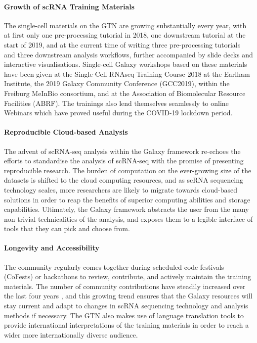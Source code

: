 \documentclass[a4paper,num-refs]{oup-contemporary}
\begin{document}
\paragraph{Growth of scRNA Training Materials}
The single-cell materials on the GTN are growing substantially every year, with at first only one pre-processing tutorial in 2018, one downstream tutorial at the start of 2019, and at the current time of writing three pre-processing tutorials and three downstream analysis workflows, further accompanied by slide decks and interactive visualisations. Single-cell Galaxy workshops based on these materials have been given at the Single-Cell RNAseq Training Course 2018 at the Earlham Institute, the 2019 Galaxy Community Conference (GCC2019), within the Freiburg MeInBio consortium, and at the Association of Biomolecular Resource Facilities (ABRF). The trainings also lend themselves seamlessly to online Webinars which have proved useful during the COVID-19 lockdown period.

\paragraph{Reproducible Cloud-based Analysis}
The advent of scRNA-seq analysis within the Galaxy framework re-echoes the efforts to standardise the analysis of scRNA-seq with the promise of presenting reproducible research. The burden of computation on the ever-growing size of the datasets is shifted to the cloud computing resources, and as scRNA sequencing technology scales, more researchers are likely to migrate towards cloud-based solutions in order to reap the benefits of superior computing abilities and storage capabilities. Ultimately, the Galaxy framework abstracts the user from the many non-trivial technicalities of the analysis, and exposes them to a legible interface of tools that they can pick and choose from.

\paragraph{Longevity and Accessibility}
The community regularly comes together during scheduled code festivals (CoFests) or hackathons to review, contribute, and actively maintain the training materials. The number of community contributions have steadily increased over the last four years \citep{afgan2018galaxy}, and this growing trend ensures that the Galaxy resources will stay current and adapt to changes in scRNA sequencing technology and analysis methods if necessary.
The GTN also makes use of language translation tools to provide international interpretations of the training materials in order to reach a wider more internationally diverse audience.
\end{document}
